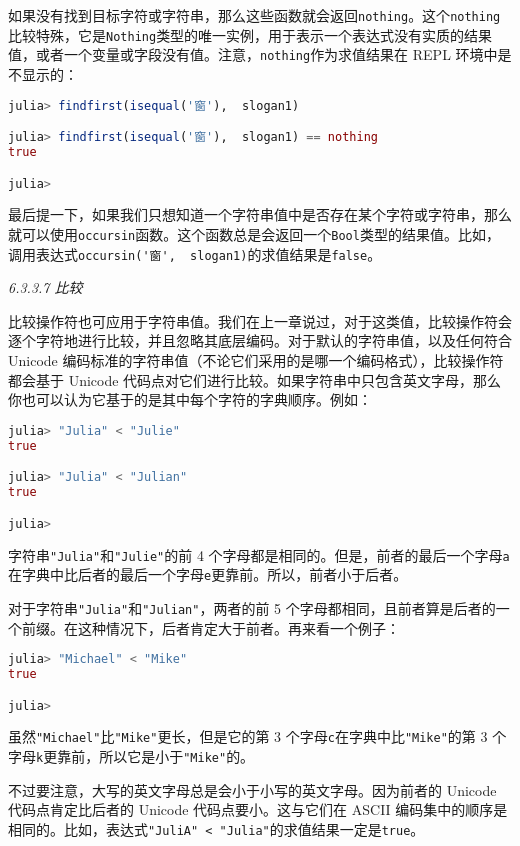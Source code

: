 如果没有找到目标字符或字符串，那么这些函数就会返回\verb|nothing|。这个\verb|nothing|比较特殊，它是\verb|Nothing|类型的唯一实例，用于表示一个表达式没有实质的结果值，或者一个变量或字段没有值。注意，\verb|nothing|作为求值结果在 REPL 环境中是不显示的：
\begin{lstlisting}[language=julia]
julia> findfirst(isequal('窗'),  slogan1) 

julia> findfirst(isequal('窗'),  slogan1) == nothing
true

julia> 
\end{lstlisting}

最后提一下，如果我们只想知道一个字符串值中是否存在某个字符或字符串，那么就可以使用\verb|occursin|函数。这个函数总是会返回一个\verb|Bool|类型的结果值。比如，调用表达式\verb|occursin('窗',  slogan1)|的求值结果是\verb|false|。

\textsl{6.3.3.7 比较}

比较操作符也可应用于字符串值。我们在上一章说过，对于这类值，比较操作符会逐个字符地进行比较，并且忽略其底层编码。对于默认的字符串值，以及任何符合 Unicode 编码标准的字符串值（不论它们采用的是哪一个编码格式），比较操作符都会基于 Unicode 代码点对它们进行比较。如果字符串中只包含英文字母，那么你也可以认为它基于的是其中每个字符的字典顺序。例如：
\begin{lstlisting}[language=julia]
julia> "Julia" < "Julie"
true

julia> "Julia" < "Julian" 
true

julia> 
\end{lstlisting}

字符串\verb|"Julia"|和\verb|"Julie"|的前 4 个字母都是相同的。但是，前者的最后一个字母\verb|a|在字典中比后者的最后一个字母\verb|e|更靠前。所以，前者小于后者。

对于字符串\verb|"Julia"|和\verb|"Julian"|，两者的前 5 个字母都相同，且前者算是后者的一个前缀。在这种情况下，后者肯定大于前者。再来看一个例子：
\begin{lstlisting}[language=julia]
julia> "Michael" < "Mike"
true

julia> 
\end{lstlisting}

虽然\verb|"Michael"|比\verb|"Mike"|更长，但是它的第 3 个字母\verb|c|在字典中比\verb|"Mike"|的第 3 个字母\verb|k|更靠前，所以它是小于\verb|"Mike"|的。

不过要注意，大写的英文字母总是会小于小写的英文字母。因为前者的 Unicode 代码点肯定比后者的 Unicode 代码点要小。这与它们在 ASCII 编码集中的顺序是相同的。比如，表达式\verb|"JuliA" < "Julia"|的求值结果一定是\verb|true|。

